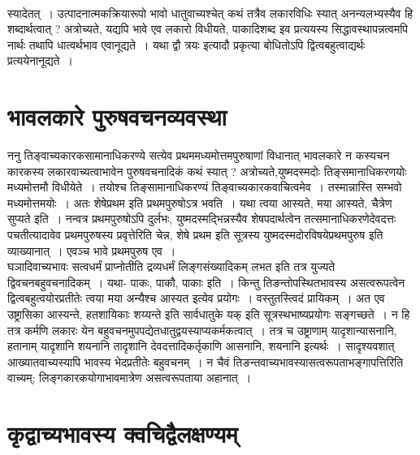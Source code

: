 {~\\[0.1cm]
स्यादेतत्~। उत्पादनात्मकक्रियारूपो भावो धातुवाच्यश्चेत् कथं तत्रैव लकारविधिः स्यात् अनन्यलभ्यस्यैव हि शब्दार्थत्वात् ? अत्रोच्यते, यद्यपि भावे एव लकारो विधीयते, पाकादिशब्द इव प्रत्ययस्य सिद्धावस्थापन्नत्वमपि नार्थः तथापि धात्वर्थभाव एवानूद्यते~। यथा द्वौ त्रयः इत्यादौ प्रकृत्या बोधितोऽपि द्वित्वबहुत्वाद्यर्थः प्रत्ययेनानूद्यते~। 

\section*{भावलकारे पुरुषवचनव्यवस्था} 

ननु तिङ्वाच्यकारकसामानाधिकरण्ये सत्येव प्रथममध्यमोत्तमपुरुषाणां विधानात् भावलकारे न कस्यचन कारकस्य लकारवाच्यत्वाभावेन पुरुषवचनादिकं कथं स्यात् ? अत्रोच्यते,\break युष्मदस्मदोः तिङ्समानाधिकरणयोः मध्यमोत्तमौ विधीयेते~। तयोश्च तिङ्सामानाधिकरण्यं तिङ्वाच्यकारकवाचित्वमेव~। तस्मान्नास्ति सम्भवो मध्यमोत्तमयोः~। अतः शेषे\break प्रथम इति प्रथमपुरुषोऽत्र भवति~। यथा त्वया आस्यते, मया आस्यते, चैत्रेण सुप्यते इति~। नन्वत्र प्रथमपुरुषोऽपि दुर्लभः, युष्मदस्मद्भिन्नस्यैव शेषपदार्थत्वेन तत्समानाधिकरणे\hbox{देवदत्तः} पचतीत्यादावेव प्रथमपुरुषस्य प्रवृत्तेरिति चेन्न, शेषे प्रथम इति सूत्रस्य युष्मदस्मदोरविषये\break प्रथमपुरुष इति व्याख्यानात्~। एवञ्च भावे प्रथमपुरुष एव~। 
~\\[0.1cm]
घञादिवाच्यभावः सत्वधर्मं प्राप्नोतीति द्रव्यधर्मं लिङ्गसंख्यादिकम् लभत इति तत्र युज्यते द्विवचनबहुवचनादिकम्~। यथा- पाकः, पाकौ, पाकाः इति~। किन्तु तिङन्तोपस्थितभावस्य असत्वरूपत्वेन द्वित्वबहुत्वयोरप्रतीतेः त्वया मया अन्यैश्च आस्यत इत्येव प्रयोगः~। वस्तुतस्त्विदं प्रायिकम्~। अत एव उष्ट्रासिका आस्यन्ते, हतशायिकाः शय्यन्ते इति सार्वधातुके यक् इति सूत्रस्थभाष्यप्रयोगः सङ्गच्छते~। न हि तत्र कर्मणि लकारः येन बहुवचनमुपपद्येत\break धातुद्वयस्याप्यकर्मकत्वात्~। तत्र च उष्ट्राणाम् यादृशान्यासनानि, हतानाम् यादृशानि शयनानि तादृशानि देवदत्तादिकर्तृकाणि आसनानि, शयनानि इत्यर्थः~। सादृश्यवशात् आख्यातवाच्यस्यापि भावस्य भेदप्रतीतेः बहुवचनम्~। न चैवं तिङन्तवाच्यभावस्यासत्वरूपताभङ्गापत्तिरिति वाच्यम्; लिङ्गकारकयोगाभावमात्रेण असत्वरूपताया अहानात्~। 
~\\[-1cm]
\section*{कृद्वाच्यभावस्य क्वचिद्वैलक्षण्यम्} 

}
